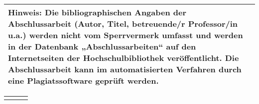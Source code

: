 \begin{table}[h]
\footnotesize 
\begin{tabularx}{15cm}{|X|}
\hline
Hinweis: Die bibliographischen Angaben der Abschlussarbeit (Autor, Titel, betreuende/r Professor/in u.a.) werden nicht vom Sperrvermerk umfasst und werden in der Datenbank „Abschlussarbeiten“ auf den Internetseiten der Hochschulbibliothek veröffentlicht. Die Abschlussarbeit kann im automatisierten Verfahren durch eine Plagiatssoftware geprüft werden.\\
\hline
\end{tabularx}
\end{table}
\vfill
\begin{table}[H]
\begin{tabularx}{15cm}{XXX}
\cline{1-1} \cline{3-3}
\centering
\getAuthor{} &  & \getCompany{}
\end{tabularx}
\end{table}
\WarningsOn[]